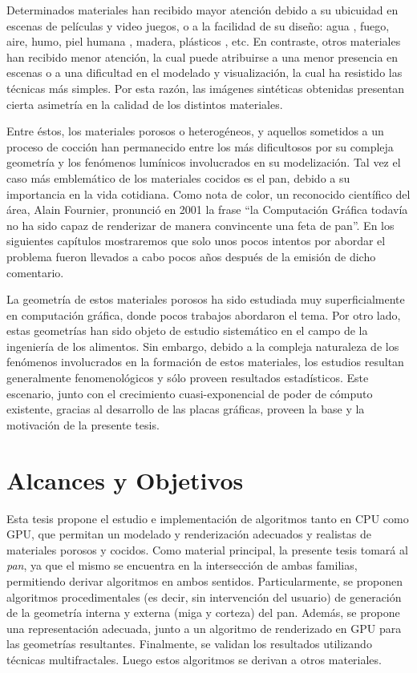 Determinados materiales han recibido mayor atención debido a su ubicuidad en escenas de películas y video juegos, o a la facilidad de su diseño: agua \cite{Schechter2012}, fuego, aire, humo, piel humana \cite{Donner2006}, madera, plásticos \cite{Kurt2010}, etc.
En contraste, otros materiales han recibido menor atención, la cual puede atribuirse a una menor presencia en escenas o a una dificultad en el modelado y visualización, la cual ha resistido las técnicas más simples.
Por esta razón, las imágenes sintéticas obtenidas presentan cierta asimetría en la calidad de los distintos materiales.

Entre éstos, los materiales porosos o heterogéneos, y aquellos sometidos a un proceso de cocción han permanecido entre los más dificultosos por su compleja geometría y los fenómenos lumínicos involucrados en su modelización.
Tal vez el caso más emblemático de los materiales cocidos es el pan, debido a su importancia en la vida cotidiana.
Como nota de color, un reconocido  científico del área, Alain Fournier, pronunció en 2001 la frase ``la Computación Gráfica todavía no ha sido capaz de renderizar de manera convincente una feta de pan''.
En los siguientes capítulos mostraremos que solo unos pocos intentos por abordar el problema fueron llevados a cabo pocos años después de la emisión de dicho comentario.

La geometría de estos materiales porosos ha sido estudiada muy superficialmente en computación gráfica, donde pocos trabajos abordaron el tema.
Por otro lado, estas geometrías han sido objeto de estudio sistemático en el campo de la ingeniería de los alimentos.
Sin embargo, debido a la compleja naturaleza de los fenómenos involucrados en la formación de estos materiales, los estudios resultan generalmente fenomenológicos y sólo proveen resultados estadísticos.
Este escenario, junto con el crecimiento cuasi-exponencial de poder de cómputo existente, gracias al desarrollo de las placas gráficas, proveen la base y la motivación de la presente tesis.

\section{Alcances y Objetivos}
Esta tesis propone el estudio e implementación de algoritmos tanto en CPU como GPU, que permitan un modelado y renderización adecuados y realistas de materiales porosos y cocidos.
Como material principal, la presente tesis tomará al {\em pan}, ya que el mismo se encuentra en la intersección de ambas familias, permitiendo derivar algoritmos en ambos sentidos.
Particularmente, se proponen algoritmos procedimentales (es decir, sin intervención del usuario) de generación de la geometría interna y externa (miga y corteza) del pan.
Además, se propone una representación adecuada, junto a un algoritmo de renderizado en GPU para las geometrías resultantes.
Finalmente, se validan los resultados utilizando técnicas multifractales.
Luego estos algoritmos se derivan a otros materiales.

